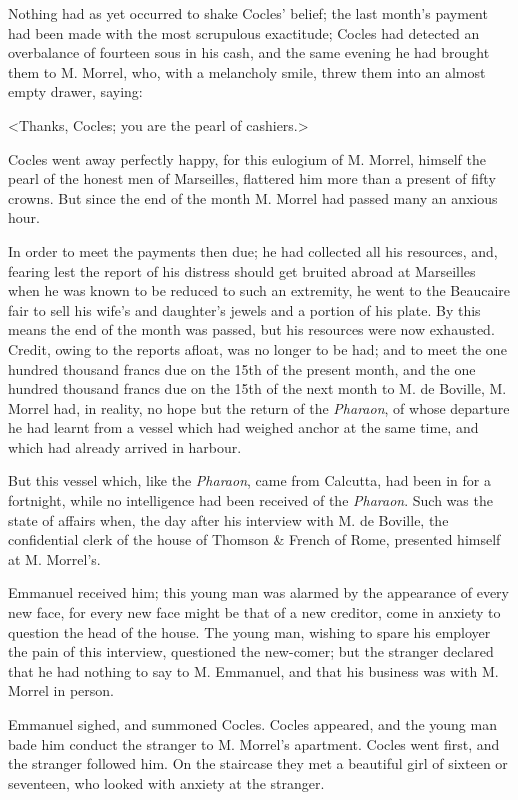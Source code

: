  Nothing had as yet occurred to shake Cocles' belief; the last month's payment had been made with the most scrupulous exactitude; Cocles had detected an overbalance of fourteen sous in his cash, and the same evening he had brought them to M. Morrel, who, with a melancholy smile, threw them into an almost empty drawer, saying: 

 <Thanks, Cocles; you are the pearl of cashiers.> 

 Cocles went away perfectly happy, for this eulogium of M. Morrel, himself the pearl of the honest men of Marseilles, flattered him more than a present of fifty crowns. But since the end of the month M. Morrel had passed many an anxious hour. 

 In order to meet the payments then due; he had collected all his resources, and, fearing lest the report of his distress should get bruited abroad at Marseilles when he was known to be reduced to such an extremity, he went to the Beaucaire fair to sell his wife's and daughter's jewels and a portion of his plate. By this means the end of the month was passed, but his resources were now exhausted. Credit, owing to the reports afloat, was no longer to be had; and to meet the one hundred thousand francs due on the 15th of the present month, and the one hundred thousand francs due on the 15th of the next month to M. de Boville, M. Morrel had, in reality, no hope but the return of the \textit{Pharaon}, of whose departure he had learnt from a vessel which had weighed anchor at the same time, and which had already arrived in harbour. 

 But this vessel which, like the \textit{Pharaon}, came from Calcutta, had been in for a fortnight, while no intelligence had been received of the \textit{Pharaon}.  Such was the state of affairs when, the day after his interview with M. de Boville, the confidential clerk of the house of Thomson \& French of Rome, presented himself at M. Morrel's. 

 Emmanuel received him; this young man was alarmed by the appearance of every new face, for every new face might be that of a new creditor, come in anxiety to question the head of the house. The young man, wishing to spare his employer the pain of this interview, questioned the new-comer; but the stranger declared that he had nothing to say to M. Emmanuel, and that his business was with M. Morrel in person. 

 Emmanuel sighed, and summoned Cocles. Cocles appeared, and the young man bade him conduct the stranger to M. Morrel's apartment. Cocles went first, and the stranger followed him. On the staircase they met a beautiful girl of sixteen or seventeen, who looked with anxiety at the stranger. 

